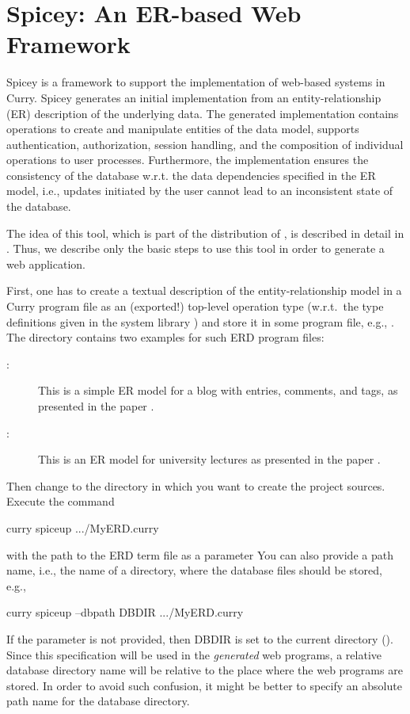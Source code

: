 \section{Spicey: An ER-based Web Framework}
\label{sec-spicey}

Spicey is a framework to support the implementation of
web-based systems in Curry. Spicey generates an initial implementation
from an entity-relationship (ER) description of the underlying
data. The generated implementation contains operations to create and
manipulate entities of the data model, supports authentication,
authorization, session handling, and the composition of individual
operations to user processes. Furthermore, the implementation ensures
the consistency of the database w.r.t. the data dependencies specified
in the ER model, i.e., updates initiated by the user cannot lead to an
inconsistent state of the database.

The idea of this tool, which is part of the distribution of \CYS,
is described in detail in \cite{HanusKoschnicke14TPLP}.
Thus, we describe only the basic steps to use this tool
in order to generate a web application.

First, one has to create a textual description of the
entity-relationship model
in a Curry program file as an (exported!) top-level operation type 
(w.r.t.\ the type definitions given in the system library
)
and store it in some program file, e.g., .
The directory 
contains two examples for such ERD program files:
\begin{description}
\item[:]
This is a simple ER model for a blog with entries, comments,
and tags, as presented in the paper \cite{HanusKoschnicke14TPLP}.
\item[:]
This is an ER model for university lectures as
presented in the paper \cite{BrasselHanusMueller08PADL}.
\end{description}
%
Then change to the directory in which you want to create
the project sources.
Execute the command
\begin{curry}
curry spiceup .../MyERD.curry
\end{curry}
with the path to the ERD term file as a parameter
You can also provide a path name, i.e., the name of a directory,
where the database files should be stored, e.g.,
\begin{curry}
curry spiceup --dbpath DBDIR .../MyERD.curry
\end{curry}
If the parameter  is not provided,
then DBDIR is set to the current directory ().
Since this specification will be used in the \emph{generated} web programs,
a relative database directory name will be relative to the place where
the web programs are stored.
In order to avoid such confusion, it might be better to specify
an absolute path name for the database directory.

